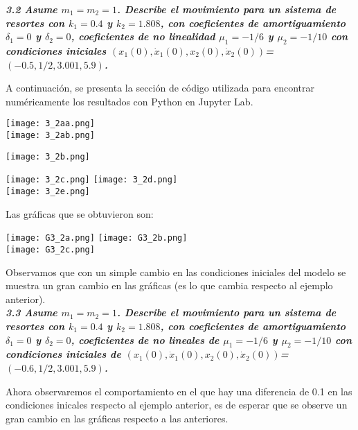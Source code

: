 \documentclass[12pt]{article}
\begin{document}
\textbf{ \textit{3.2 Asume $m_1=m_2=1$. Describe el movimiento para un sistema de resortes con $k_1=0.4$ y $k_2=1.808$, con coeficientes de amortiguamiento $\delta_1=0$ y $\delta_2=0$, coeficientes de no linealidad $\mu_1=-1/6$ y $\mu_2=-1/10$ con condiciones iniciales  $(x_1(0), \dot x_1(0), x_2(0), \dot x_2(0))$=$(-0.5,1/2,3.001,5.9)$.}\\}

A continuación, se presenta la sección de código utilizada para encontrar numéricamente los resultados con Python en Jupyter Lab.
\begin{center}
    \texttt{[image: 3\_2aa.png]}\\
     \texttt{[image: 3\_2ab.png]}\\
\end{center}
\begin{center}
    \texttt{[image: 3\_2b.png]}
\end{center}
\begin{center}
    \texttt{[image: 3\_2c.png]}\hspace*{\fill}
    \texttt{[image: 3\_2d.png]}\\
     \texttt{[image: 3\_2e.png]}
\end{center}
Las gráficas que se obtuvieron son:
\begin{center}
    \texttt{[image: G3\_2a.png]}\hspace*{\fill}
    \texttt{[image: G3\_2b.png]}\\
     \texttt{[image: G3\_2c.png]}
\end{center}
Observamos que con un simple cambio en las condiciones iniciales del modelo se muestra un gran cambio en las gráficas (es lo que cambia respecto al ejemplo anterior).\\

\textbf{ \textit{3.3 Asume $m_1=m_2=1$. Describe el movimiento para un sistema de resortes con $k_1=0.4$ y $k_2=1.808$, con coeficientes de amortiguamiento $\delta_1=0$ y $\delta_2=0$, coeficientes de no lineales de $\mu_1=-1/6$ y $\mu_2=-1/10$ con condiciones iniciales de $(x_1(0), \dot x_1(0), x_2(0), \dot x_2(0))$=$(-0.6,1/2,3.001,5.9)$.}\\}

Ahora observaremos el comportamiento en el que hay una diferencia de 0.1 en las condiciones inicales respecto al ejemplo anterior, es de esperar que se observe un gran cambio en las gráficas respecto a las anteriores.\\
\end{document}

